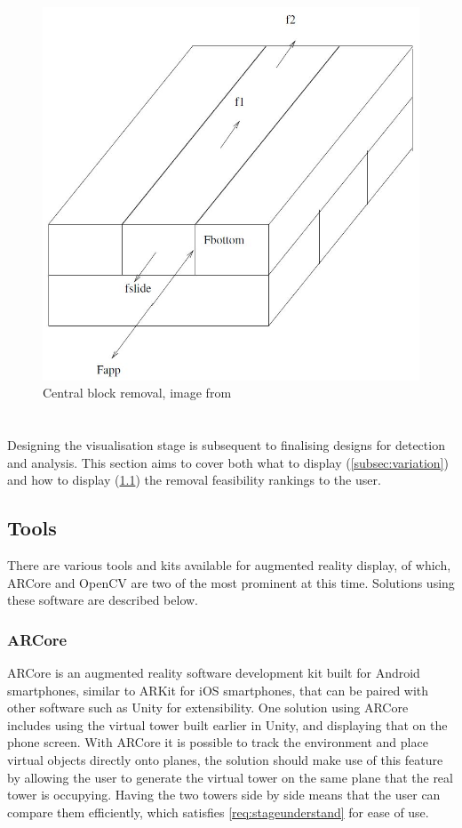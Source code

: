 \begin{figure}
    \centering
    \includegraphics[width=.4\textwidth]{images/design/analysisjengamovement}
    \caption{Central block removal, image from \citet{jengaanalysis}}
    \label{fig:centralblockremoval}
\end{figure}

\section{\display}

Designing the visualisation stage is subsequent to finalising designs for detection and analysis. This section aims to cover both what to display (\cref{subsec:variation}) and how to display (\cref{subsec:tools}) the removal feasibility rankings to the user.

\subsection{Tools}\label{subsec:tools}

There are various tools and kits available for augmented reality display, of which, ARCore and OpenCV are two of the most prominent at this time. Solutions using these software are described below.

\subsubsection{ARCore}

ARCore is an augmented reality software development kit built for Android smartphones, similar to ARKit for iOS smartphones, that can be paired with other software such as Unity for extensibility. One solution using ARCore includes using the virtual tower built earlier in Unity, and displaying that on the phone screen. With ARCore it is possible to track the environment and place virtual objects directly onto planes, the solution should make use of this feature by allowing the user to generate the virtual tower on the same plane that the real tower is occupying. Having the two towers side by side means that the user can compare them efficiently, which satisfies \cref{req:stageunderstand} for ease of use.


